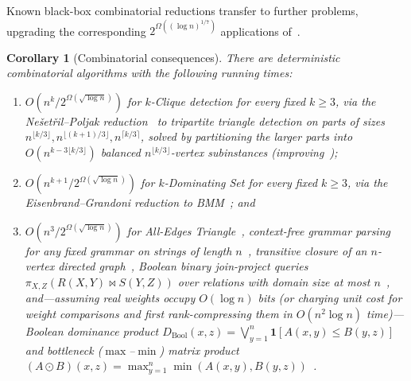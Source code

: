 \documentclass[11pt]{article}
\newtheorem{corollary}[theorem]{Corollary}
\theoremstyle{definition}
\renewcommand{\label}[1]{}%
\newcommand{\One}{\mathbf{1}}
\begin{document}
Known black-box combinatorial reductions transfer  to further problems, upgrading the corresponding $2^{\Omega((\log n)^{1/7})}$ applications of~\cite{AFKLM24}.

\begin{corollary}[Combinatorial consequences]
\label{cor:consequences}
There are deterministic combinatorial algorithms with the following running times:
\begin{enumerate}[leftmargin=*]
    \item $O\!\left(n^k / 2^{\Omega(\sqrt{\log n})}\right)$ for $k$-Clique detection for every fixed $k \ge 3$, via the Ne\v{s}et\v{r}il--Poljak reduction~\cite{NesetrilP85} to tripartite triangle detection on parts of sizes $n^{\lfloor k/3 \rfloor}, n^{\lfloor (k+1)/3 \rfloor}, n^{\lceil k/3 \rceil}$, solved by partitioning the larger parts into $O(n^{k - 3\lfloor k/3 \rfloor})$ balanced $n^{\lfloor k/3 \rfloor}$-vertex subinstances (improving~\cite{AbboudFS24,AFKLM24});
    \item $O\!\left(n^{k+1} / 2^{\Omega(\sqrt{\log n})}\right)$ for $k$-Dominating Set for every fixed $k \ge 3$, via the Eisenbrand--Grandoni reduction to BMM~\cite{EisenbrandG04}; and
    \item $O\!\left(n^3 / 2^{\Omega(\sqrt{\log n})}\right)$ for All-Edges Triangle~\cite{WilliamsW18}, context-free grammar parsing for any fixed grammar on strings of length $n$~\cite{Valiant75,Lee02}, transitive closure of an $n$-vertex directed graph~\cite{FischerM71,Munro71}, Boolean binary join-project queries $\pi_{X, Z}(R(X, Y) \bowtie S(Y, Z))$ over relations with domain size at most $n$~\cite{AmossenP09,GuchtWWZ15}, and---assuming real weights occupy $O(\log n)$ bits (or charging unit cost for weight comparisons and first rank-compressing them in $O(n^2\log n)$ time)---Boolean dominance product $D_{\mathrm{Bool}}(x, z) = \bigvee_{y=1}^n \One[A(x, y) \le B(y, z)]$~\cite{Matousek91} and bottleneck ($\max$--$\min$) matrix product $(A \odot B)(x, z) = \max_{y=1}^n \min(A(x, y), B(y, z))$~\cite{VassilevskaWY07}.
\end{enumerate}
\end{corollary}
\end{document}
